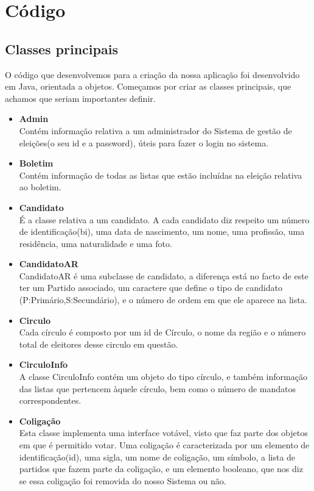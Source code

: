 \documentclass[a4paper,12pt]{report}
\begin{document}
\section{Código}

\subsection{Classes principais}

O código que desenvolvemos para a criação da nossa aplicação foi desenvolvido em Java, orientada a objetos.
Começamos por criar as classes principais, que achamos que seriam importantes definir.
\begin{itemize}
\item \textbf{Admin}
\\ Contém informação relativa a um administrador do Sistema de gestão de eleições(o seu id e a password), úteis para fazer o login no sistema.
\item \textbf{Boletim}
\\ Contém informação de todas as listas que estão incluídas na eleição relativa ao boletim.
\item \textbf{Candidato}
\\ É a classe relativa a um candidato. A cada candidato diz respeito um número de identificação(bi), uma data de nascimento, um nome, uma profissão, uma residência, uma naturalidade e uma foto.
\item \textbf{CandidatoAR}
\\ CandidatoAR é uma subclasse de candidato, a diferença está no facto de este ter um Partido associado, um caractere que define o tipo de candidato (P:Primário,S:Secundário), e o número de ordem em que ele aparece na lista.
\item \textbf{Circulo}
\\ Cada círculo é composto por um id de Círculo, o nome da região e o número total de eleitores desse circulo em questão.
\item \textbf{CirculoInfo}
\\ A classe CirculoInfo contém um objeto do tipo círculo, e também informação das listas que pertencem àquele círculo, bem como o número de mandatos correspondentes.
\item \textbf{Coligação}
\\ Esta classe implementa uma interface votável, visto que faz parte dos objetos em que é permitido votar. Uma coligação é caracterizada por um elemento de identificação(id), uma sigla, um nome de coligação, um símbolo, a lista de partidos que fazem parte da coligação, e um elemento booleano, que nos diz se essa coligação foi removida do nosso Sistema ou não.

\end{itemize}
\end{document}
